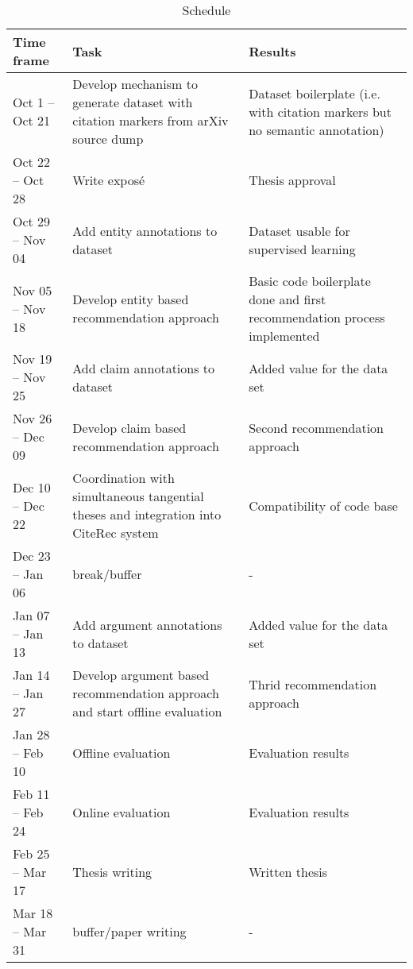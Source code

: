 \documentclass{proseminar}
\begin{document}
\begin{table*}
\centering
\caption{Schedule}\label{schedule}
\hphantom{ }
\begin{tabular}{|p{2.5cm}|p{6cm}|p{4cm}|} \hline
Time frame&Task&Results\\ \hline
Oct 1 -- Oct 21 & Develop mechanism to generate dataset with citation markers from arXiv source dump & Dataset boilerplate (i.e. with citation markers but no semantic annotation)\\ \hline
Oct 22 -- Oct 28 & Write expos\'e  & Thesis approval\\ \hline
Oct 29 -- Nov 04 & Add entity annotations to dataset & Dataset usable for supervised learning\\ \hline
Nov 05 -- Nov 18 & Develop entity based recommendation approach & Basic code boilerplate done and first recommendation process implemented\\ \hline
Nov 19 -- Nov 25 & Add claim annotations to dataset & Added value for the data set\\ \hline
Nov 26 -- Dec 09 & Develop claim based recommendation approach & Second recommendation approach\\ \hline
Dec 10 -- Dec 22 & Coordination with simultaneous tangential theses and integration into CiteRec system & Compatibility of code base\\ \hline
Dec 23 -- Jan 06 & break/buffer & -\\ \hline
Jan 07 -- Jan 13 & Add argument annotations to dataset & Added value for the data set\\ \hline
Jan 14 -- Jan 27 & Develop argument based recommendation approach and start offline evaluation & Thrid recommendation approach\\ \hline
Jan 28 -- Feb 10 & Offline evaluation & Evaluation results\\ \hline
Feb 11 -- Feb 24 & Online evaluation & Evaluation results\\ \hline
Feb 25 -- Mar 17 & Thesis writing & Written thesis\\ \hline
Mar 18 -- Mar 31 & buffer/paper writing & -\\ \hline\end{tabular}
\end{table*}
\end{document}
